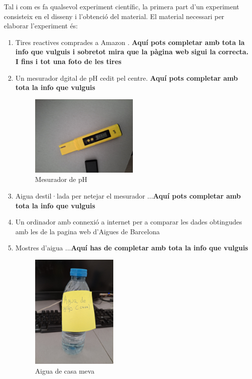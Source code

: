 Tal i com es fa qualsevol experiment científic, la primera part d'un experiment consisteix en el disseny i l'obtenció del material. El material necessari per elaborar l'experiment és:
\begin{enumerate}
 \item Tires reactives comprades a Amazon \cite{tiresReactives}. \textbf{Aquí pots completar amb tota la info que vulguis i sobretot mira que la pàgina web sigui la correcta. I fins i tot una foto de les tires}
 \item Un mesurador dgital de pH cedit pel centre.  \textbf{Aquí pots completar amb tota la info que vulguis}
 \begin{figure}[h!]
\centering
\includegraphics[width=0.5\textwidth]{./Figures/mesurador.png}
\caption{Mesurador de pH}
\label{fig:fotoMesuradorPH}%
\end{figure}
 \item Aigua destil·lada per netejar el mesurador ...\textbf{Aquí pots completar amb tota la info que vulguis}
 \item Un ordinador amb connexió a internet per a comparar les dades obtingudes amb les de la pagina web d'Aigues de Barcelona \cite{qualitatAigua}
 \item Mostres d'aigua ...\textbf{Aquí has de completar amb tota la info que vulguis}
 \begin{figure}[h!]
\centering
\includegraphics[width=0.4\textwidth, angle=270]{./Figures/aguadecasa.png}
\caption{Aigua de casa meva}
\label{fig:fotoAiguaCasaMeva}
\end{figure}
\end{enumerate}

